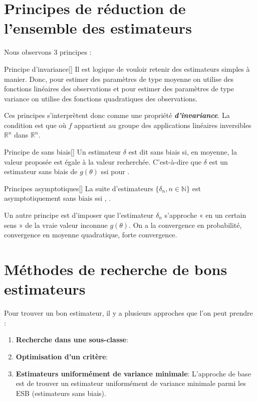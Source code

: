 \documentclass[10pt, french]{report}
\begin{document}
\begin{multicols*}{2}
\section{Principes de réduction de l'ensemble des estimateurs}
Nous observons 3 principes :

\begin{definitionGENERAL}{Principe d'invariance}[]
Il est logique de vouloir retenir des estimateurs simples à manier. Donc, pour estimer des paramètres de type moyenne on utilise des fonctions linéaires des observations et pour estimer des paramètres de type variance on utilise des fonctions quadratiques des observations.

\bigskip

Ces principes s'interprètent donc comme une propriété \textbf{\textit{d'invariance}}. La condition est que  où $f$ appartient au groupe des applications linéaires inversibles $\mathbb{R}^{n}$ dans $\mathbb{R}^{n}$.
\end{definitionGENERAL}

\begin{definitionGENERAL}{Principe de sans biais}[]
Un estimateur $\delta$ est dit sans biais si, en moyenne, la valeur proposée est égale à la valeur recherchée. C'est-à-dire que $\delta$ est un estimateur sans biais de $g(\theta)$ ssi  pour \lfbox[conditions]{$\forall \theta \in \Theta$}.
\end{definitionGENERAL}

\begin{definitionGENERAL}{Principes asymptotiques}[]
La suite d'estimateurs $\{\delta_{n}, n \in \mathbb{N}\}$ est asymptotiquement sans biais ssi , \lfbox[conditions]{$\forall \theta \in \Theta$}.

\bigskip

Un autre principe est d'imposer que l'estimateur $\delta_{n}$ s'approche « en un certain sens » de la vraie valeur inconnue $g(\theta)$. On a la convergence en probabilité, convergence en moyenne quadratique, forte convergence.
\end{definitionGENERAL}


\columnbreak
\section{Méthodes de recherche de bons estimateurs}
Pour trouver un bon estimateur, il y a plusieurs approches que l'on peut prendre : 
\begin{enumerate}
	\item	\textbf{Recherche dans une sous-classe}: 
	\item	\textbf{Optimisation d'un critère}: 
	\item	\textbf{Estimateurs uniformément de variance minimale}: L'approche de base est de trouver un estimateur uniformément de variance minimale parmi les ESB (estimateurs sans biais).
\end{enumerate}


\end{multicols*}
\end{document}
